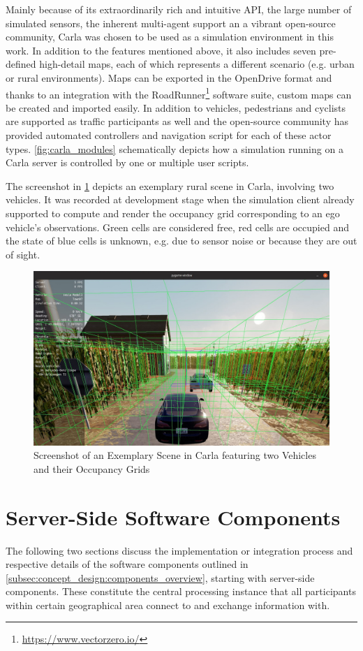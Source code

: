 Mainly because of its extraordinarily rich and intuitive API, the large number of simulated sensors, the inherent multi-agent support an a vibrant open-source community, Carla was chosen to be used as a simulation environment in this work. In addition to the features mentioned above, it also includes seven pre-defined high-detail maps, each of which represents a different scenario (e.g. urban or rural environments). Maps can be exported in the OpenDrive format and thanks to an integration with the RoadRunner\footnote{\url{https://www.vectorzero.io/}} software suite, custom maps can be created and imported easily. In addition to vehicles, pedestrians and cyclists are supported as traffic participants as well and the open-source community has provided automated controllers and navigation script for each of these actor types. \cref{fig:carla_modules} schematically depicts how a simulation running on a Carla server is controlled by one or multiple user scripts.

The screenshot in \cref{fig:carla_sceenshot_1} depicts an exemplary rural scene in Carla, involving two vehicles. It was recorded at development stage when the simulation client already supported to compute and render the occupancy grid corresponding to an ego vehicle's observations. Green cells are considered free, red cells are occupied and the state of blue cells is unknown, e.g. due to sensor noise or because they are out of sight.

\begin{figure}[h]
	\centering
	\includegraphics[width=0.9\linewidth]{98_images/carla_screenshot_1}
	\caption[Screenshot of an Exemplary Carla Scene]{Screenshot of an Exemplary Scene in Carla featuring two Vehicles and their Occupancy Grids}
	\label{fig:carla_sceenshot_1}
\end{figure}

\section{Server-Side Software Components}
\label{sec:implementation:server_side_software_components}
The following two sections discuss the implementation or integration process and respective details of the software components outlined in \cref{subsec:concept_design:components_overview}, starting with server-side components. These constitute the central processing instance that all participants within certain geographical area connect to and exchange information with. 

